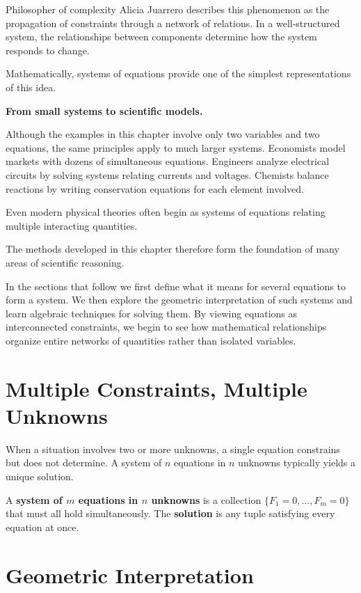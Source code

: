 \documentclass[11pt, openany]{book}
\theoremstyle{plain}
\theoremstyle{definition}
\theoremstyle{remark}
\begin{document}
Philosopher of complexity Alicia Juarrero describes this phenomenon as
the propagation of constraints through a network of relations. In a
well-structured system, the relationships between components determine
how the system responds to change.

Mathematically, systems of equations provide one of the simplest
representations of this idea.

\medskip

\textbf{From small systems to scientific models.}

Although the examples in this chapter involve only two variables and two
equations, the same principles apply to much larger systems. Economists
model markets with dozens of simultaneous equations. Engineers analyze
electrical circuits by solving systems relating currents and voltages.
Chemists balance reactions by writing conservation equations for each
element involved.

Even modern physical theories often begin as systems of equations
relating multiple interacting quantities.

The methods developed in this chapter therefore form the foundation of
many areas of scientific reasoning.

\medskip

In the sections that follow we first define what it means for several
equations to form a system. We then explore the geometric interpretation
of such systems and learn algebraic techniques for solving them. By
viewing equations as interconnected constraints, we begin to see how
mathematical relationships organize entire networks of quantities rather
than isolated variables.

\section{Multiple Constraints, Multiple Unknowns}

When a situation involves two or more unknowns, a single equation constrains
but does not determine. A system of $n$ equations in $n$ unknowns typically
yields a unique solution.

\begin{mydefinition}
A \textbf{system of $m$ equations in $n$ unknowns} is a collection
$\{F_1=0,\dots,F_m=0\}$ that must all hold simultaneously. The
\textbf{solution} is any tuple satisfying every equation at once.
\end{mydefinition}

\section{Geometric Interpretation}
\end{document}
